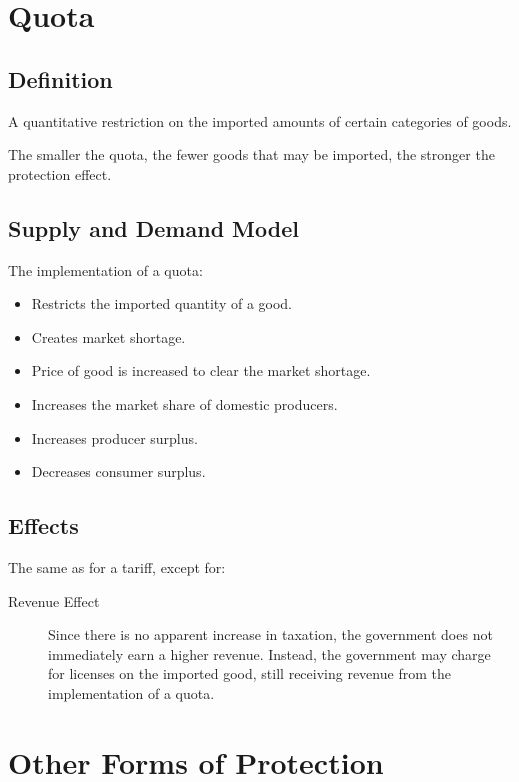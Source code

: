 \documentclass[a4paper,11pt]{article}
\begin{document}
\section{Quota}

\subsection{Definition}

A quantitative restriction on the imported amounts of certain categories of
goods.

The smaller the quota, the fewer goods that may be imported, the stronger the
protection effect.


\subsection{Supply and Demand Model}

The implementation of a quota:

\begin{itemize}
\item Restricts the imported quantity of a good.
\item Creates market shortage.
\item Price of good is increased to clear the market shortage.
\item Increases the market share of domestic producers.
\item Increases producer surplus.
\item Decreases consumer surplus.
\end{itemize}


\subsection{Effects}

The same as for a tariff, except for:

\begin{description}
\item [Revenue Effect] Since there is no apparent increase in taxation,
	the government does not immediately earn a higher revenue. Instead, the
	government may charge for licenses on the imported good, still receiving
	revenue from the implementation of a quota.
\end{description}




\section{Other Forms of Protection}
\end{document}
